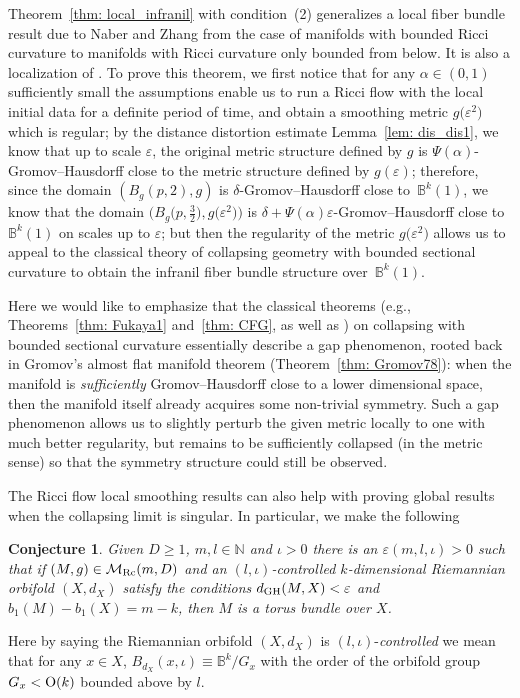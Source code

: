 \documentclass[pdftex]{sigma}
\numberwithin{equation}{section}
\newtheorem{Conjecture}[Theorem]{Conjecture}
\begin{document}
Theorem~\ref{thm: local_infranil} with condition~(2) generalizes a local fiber
bundle result due to Naber and Zhang \cite[Proposition~6.6]{NaberZhang} from
the case of manifolds with bounded Ricci curvature to manifolds with Ricci
curvature only bounded from below. It is also a localization of \cite[Theorem~B]{HKRX18}. To prove this theorem, we first notice that for any $\alpha \in
(0,1)$ sufficiently small the assumptions enable us to run a Ricci flow with
the local initial data for a definite period of time, and obtain a smoothing
metric $g\big(\varepsilon^2\big)$ which is regular; by the distance distortion estimate
Lemma~\ref{lem: dis_dis1}, we know that up to scale $\varepsilon$, the original
metric structure defined by $g$ is $\Psi(\alpha)$-Gromov--Hausdorff close to the
metric structure defined by $g(\varepsilon)$; therefore, since the domain
$(B_g(p,2),g)$ is $\delta$-Gromov--Hausdorff close to~$\mathbb{B}^k(1)$, we know
that the domain $\big(B_g\big(p,\frac{3}{2}\big),g\big(\varepsilon^2\big)\big)$ is
$\delta+\Psi(\alpha)\varepsilon$-Gromov--Hausdorff close to~$\mathbb{B}^k(1)$ on
scales up to $\varepsilon$; but then the regularity of the metric
$g\big(\varepsilon^2\big)$ allows us to appeal to the classical theory of collapsing
geometry \cite[Theorem~2.6]{CFG92} with bounded sectional curvature to obtain
the infranil fiber bundle structure over~$\mathbb{B}^k(1)$.

Here we would like to emphasize that the classical theorems (e.g.,
Theorems~\ref{thm: Fukaya1} and~\ref{thm: CFG}, as well as \cite[Theorem~2.6]{CFG92}) on collapsing with bounded sectional curvature essentially
describe a gap phenomenon, rooted back in Gromov's almost flat manifold theorem
(Theorem~\ref{thm: Gromov78}): when the manifold is \emph{sufficiently}
Gromov--Hausdorff close to a lower dimensional space, then the manifold itself
already acquires some non-trivial symmetry. Such a gap phenomenon allows us to
slightly perturb the given metric locally to one with much better regularity,
but remains to be sufficiently collapsed (in the metric sense) so that the
symmetry structure could still be observed.

The Ricci flow local smoothing results can also help with proving global results
when the collapsing limit is singular. In particular, we make the following
\begin{Conjecture}
Given $D\ge 1$, $m,l\in \mathbb{N}$ and $\iota>0$ there is an
$\varepsilon(m,l,\iota)>0$ such that if $(M,g)\in \mathcal{M}_{\rm Rc}(m,D)$ and an
$(l,\iota)$-controlled $k$-dimensional Riemannian orbifold $(X,d_X)$ satisfy the
conditions $d_{\rm GH}(M,X)<\varepsilon$ and $b_1(M)-b_1(X)=m-k$, then $M$ is a
torus bundle over $X$.
\end{Conjecture}
Here by saying the Riemannian orbifold $(X,d_X)$ is
$(l,\iota)$-\emph{controlled} we mean that for any $x\in X$,
$B_{d_X}(x,\iota)\equiv \mathbb{B}^k\slash G_x$ with the order
of the orbifold group $G_x<{\rm O}(k)$ bounded above by $l$.
\end{document}
